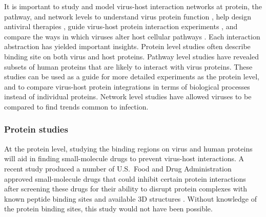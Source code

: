 It is important to study and model virus-host interaction networks at
protein, the pathway, and network levels to understand virus protein
function \cite{calderwood07}, help design antiviral therapies
\cite{brass08,dampier09}, guide virus-host protein interaction
experiments \cite{jansen2003bayesian,lee2004probabilistic}, and
compare the ways in which viruses alter host cellular pathways
\cite{navratil-system}. Each interaction abstraction has yielded
important insights. Protein level studies often describe binding site
on both virus and host proteins. Pathway level studies have revealed
subsets of human proteins that are likely to interact with virus
proteins. These studies can be used as a guide for more detailed
experiments as the protein level, and to compare virus-host protein
integrations in terms of biological processes instead of individual
proteins. Network level studies have allowed viruses to be compared to
find trends common to infection.


\subsubsection{Protein studies}

At the protein level, studying the binding regions on virus and human
proteins will aid in finding small-molecule drugs to prevent
virus-host interactions. A recent study produced a number of
U.S.\ Food and Drug Administration approved small-molecule drugs that
could inhibit certain protein interactions after screening these drugs
for their ability to disrupt protein complexes with known peptide
binding sites and available 3D structures
\cite{parthasarathi2008approved}. Without knowledge of the protein
binding sites, this study would not have been possible.

